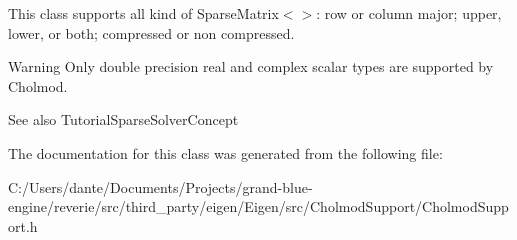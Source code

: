 This class supports all kind of Sparse\+Matrix$<$$>$\+: row or column major; upper, lower, or both; compressed or non compressed.

\begin{DoxyWarning}{Warning}
Only double precision real and complex scalar types are supported by Cholmod.
\end{DoxyWarning}
\begin{DoxySeeAlso}{See also}
Tutorial\+Sparse\+Solver\+Concept 
\end{DoxySeeAlso}


The documentation for this class was generated from the following file\+:\begin{DoxyCompactItemize}
\item 
C\+:/\+Users/dante/\+Documents/\+Projects/grand-\/blue-\/engine/reverie/src/third\+\_\+party/eigen/\+Eigen/src/\+Cholmod\+Support/Cholmod\+Support.\+h\end{DoxyCompactItemize}
